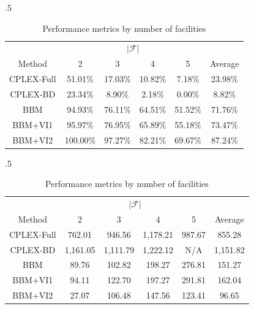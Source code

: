 \documentclass[12pt]{article}
\theoremstyle{thmstylethree}%
\begin{document}
\begin{table}[htp]
\begin{subtable}[c]{.5\textwidth}
\tiny
\centering
\begin{tabular}{|c|c|c|c|c|c|}
\hline
& \multicolumn{4}{c|}{$\vert \mathcal{F} \vert$} &  \\
 Method & 2 & 3 & 4 & 5 & Average\\
 \hline
CPLEX-Full & 51.01\% & 17.03\% & 10.82\% & 7.18\% & 23.98\% \\
CPLEX-BD & 23.34\% & 8.90\% & 2.18\% & 0.00\% & 8.82\% \\
BBM & 94.93\% & 76.11\% & 64.51\% & 51.52\% & 71.76\% \\
BBM+VI1 & 95.97\% & 76.95\% & 65.89\% & 55.18\% & 73.47\% \\
BBM+VI2 & 100.00\% & 97.27\% & 82.21\% & 69.67\% & 87.24\% \\
\hline
\end{tabular}
\label{tbl:bd_pct_solved_byf}
\end{subtable}
\begin{subtable}[c]{.5\textwidth}
\center
\tiny
\begin{tabular}{|c|c|c|c|c|c|}
\hline
& \multicolumn{4}{c|}{$\vert \mathcal{F} \vert$}  & \\
 Method & 2 & 3 & 4 & 5 & Average\\
 \hline
CPLEX-Full &  762.01  &  946.56  &  1,178.21  &  987.67  &  855.28  \\
CPLEX-BD &  1,161.05  &  1,111.79  &  1,222.12  & N/A &  1,151.82  \\
BBM &  89.76  &  102.82  &  198.27  &  276.81  &  151.27  \\
BBM+VI1 &  94.11  &  122.70  &  197.27  &  291.81  &  162.04  \\
BBM+VI2 &  27.07  &  106.48  &  147.56  &  123.41  &  96.65  \\
\hline
\end{tabular}
\label{tbl:bd_solve_time_byf}
\end{subtable}
\caption{Performance metrics by number of facilities}
\end{table}
\end{document}
